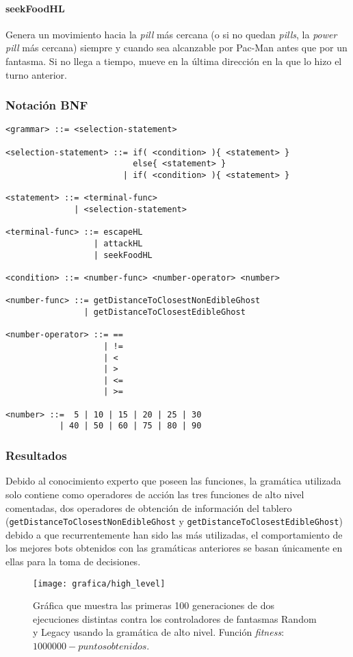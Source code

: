 \paragraph{seekFoodHL}
Genera un movimiento hacia la \textit{pill} más cercana (o si no quedan \textit{pills}, la \textit{power pill} más cercana) siempre y cuando sea alcanzable por Pac-Man antes que por un fantasma. Si no llega a tiempo, mueve en la última dirección en la que lo hizo el turno anterior.

\subsubsection{Notación BNF}
\begin{lstlisting}[caption={Gramática de alto nivel.}]
<grammar> ::= <selection-statement>

<selection-statement> ::= if( <condition> ){ <statement> }
                          else{ <statement> }
                        | if( <condition> ){ <statement> }

<statement> ::= <terminal-func>
              | <selection-statement>

<terminal-func> ::= escapeHL
                  | attackHL
                  | seekFoodHL

<condition> ::= <number-func> <number-operator> <number>

<number-func> ::= getDistanceToClosestNonEdibleGhost
                | getDistanceToClosestEdibleGhost

<number-operator> ::= ==
                    | !=
                    | <
                    | >
                    | <=
                    | >=

<number> ::=  5 | 10 | 15 | 20 | 25 | 30
           | 40 | 50 | 60 | 75 | 80 | 90
\end{lstlisting}

\subsubsection{Resultados}
Debido al conocimiento experto que poseen las funciones, la gramática utilizada solo contiene como operadores de acción las tres funciones de alto nivel comentadas, dos operadores de obtención de información del tablero  (\texttt{getDistanceToClosestNonEdibleGhost} y \texttt{getDistanceToClosestEdibleGhost}) debido a que recurrentemente han sido las más utilizadas, el comportamiento de los mejores bots obtenidos con las gramáticas anteriores se basan únicamente en ellas para la toma de decisiones.
\begin{figure}[H]
\centering
\texttt{[image: grafica/high\_level]}
\caption{Gráfica que muestra las primeras 100 generaciones de dos ejecuciones distintas contra los controladores de fantasmas Random y Legacy usando la gramática de alto nivel. Función \textit{fitness}: $1000000 - puntos obtenidos$.}
\end{figure}

